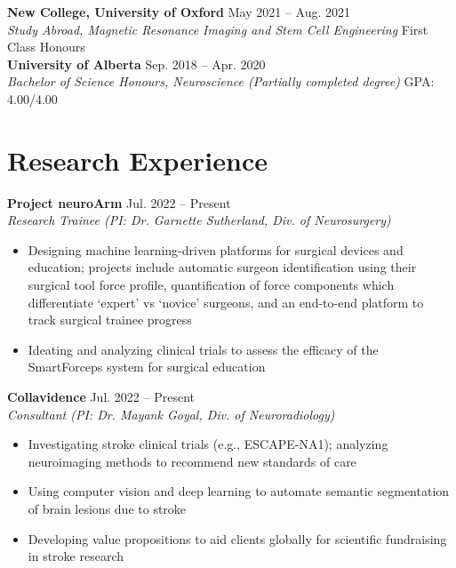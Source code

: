 \documentclass{article}
\begin{document}
\textbf{New College, University of Oxford} \hfill May 2021 -- Aug. 2021 \\
\textit{Study Abroad, Magnetic Resonance Imaging and Stem Cell Engineering} \hfill First Class Honours \\

\textbf{University of Alberta} \hfill Sep. 2018 -- Apr. 2020 \\
\textit{Bachelor of Science Honours, Neuroscience (Partially completed degree)} \hfill GPA: 4.00/4.00


\section*{\textcolor{my_colour}{Research Experience}}
\vspace{-.25em} \hrulefill \vspace{.25em}

\textbf{Project neuroArm} \hfill Jul. 2022 -- Present\\
\textit{Research Trainee (PI: Dr. Garnette Sutherland, Div. of Neurosurgery)}
\begin{itemize}
    \item Designing machine learning-driven platforms for surgical devices and education; projects include automatic surgeon identification using their surgical tool force profile, quantification of force components which differentiate `expert' vs `novice' surgeons, and an end-to-end platform to track surgical trainee progress
    \item Ideating and analyzing clinical trials to assess the efficacy of the SmartForceps system for surgical education
\end{itemize} \vspace{1em}

\textbf{Collavidence} \hfill Jul. 2022 -- Present\\
\textit{Consultant (PI: Dr. Mayank Goyal, Div. of Neuroradiology)}
\begin{itemize}
    \item Investigating stroke clinical trials (e.g., ESCAPE-NA1); analyzing neuroimaging methods to recommend new standards of care
    \item Using computer vision and deep learning to automate semantic segmentation of brain lesions due to stroke
    \item Developing value propositions to aid clients globally for scientific fundraising in stroke research
\end{itemize} \vspace{1em}
\end{document}

